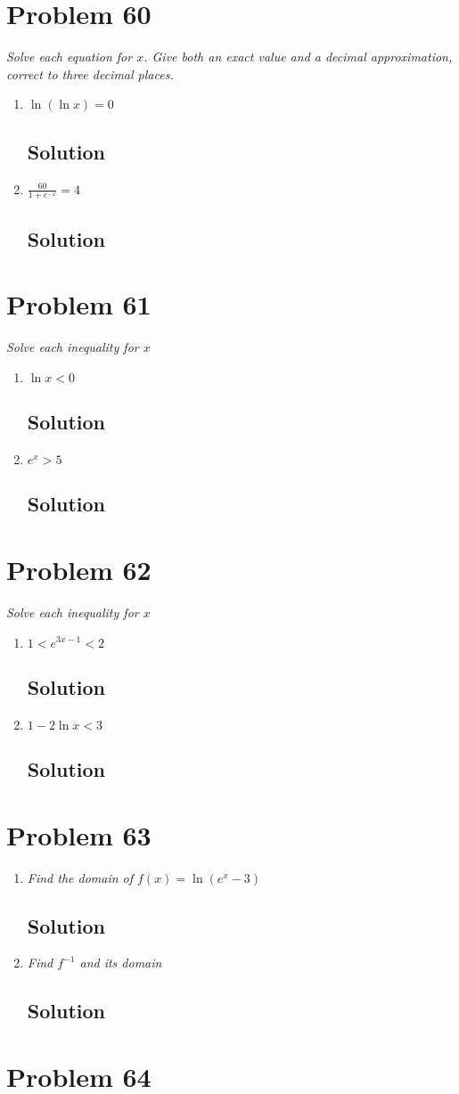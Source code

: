 \documentclass[11pt]{article}
\newcommand{\soln}{\subsection*}
\newcommand{\qn}{\textit}
\begin{document}
\section*{Problem 60}

\qn{Solve each equation for $x$. Give both an exact value and a decimal approximation, correct to three decimal places.}
\begin{enumerate}
	\item \qn{$\ln(\ln{x})=0$}
	\soln{Solution}
	
	\item \qn{$\frac{60}{1+e^{-x}}=4$}
	\soln{Solution}
\end{enumerate}

\section*{Problem 61}

\qn{Solve each inequality for $x$}
\begin{enumerate}
	\item \qn{$\ln{x}<0$}
	\soln{Solution}
	
	\item \qn{$e^x>5$}
	\soln{Solution}
\end{enumerate}


\section*{Problem 62}

\qn{Solve each inequality for $x$}
\begin{enumerate}
	\item \qn{$1 < e^{3x-1} < 2$}
	\soln{Solution}
	
	\item \qn{$1 -2\ln{x}<3$}
	\soln{Solution}
\end{enumerate}

\section*{Problem 63}

\begin{enumerate}
	\item \qn{Find the domain of $f(x)=\ln(e^x-3)$}
	\soln{Solution}
	
	\item \qn{Find $f^{-1}$ and its domain}
	\soln{Solution}
\end{enumerate}

\section*{Problem 64}
\end{document}
